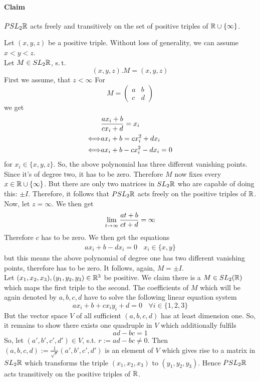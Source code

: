 \documentclass{book}
\begin{document}
\paragraph{Claim} $PSL_2\mathbb{R}$ acts freely and transitively on the set of positive triples of $\mathbb{R} \cup \{\infty\}$.
\begin{Beweis}{}
	Let $(x,y,z)$ be a positive triple. Without loss of generality, we can assume $x<y<z$.\\
	Let $M \in SL_2\mathbb{R}$, s.\,t.
	\[ (x,y,z).M = (x,y,z) \]
	First we assume, that $z < \infty$
	For
	\[ M = \left(
	\begin{matrix}
	a & b \\
	c & d
	\end{matrix}
	\right) \]
	we get
	\begin{align*}
	&\frac{ax_i + b}{cx_i + d} = x_i\\
	\overset{}{\Longleftrightarrow} & ax_i + b = cx_i^2 + dx_i\\
	\overset{}{\Longleftrightarrow} & ax_i + b - cx_i^2 - dx_i = 0
	\end{align*}
	for $x_i \in \{x,y,z\}$. So, the above polynomial has three different vanishing points. Since it's of degree two, it has to be zero. Therefore $M$ now fixes every $x \in \mathbb{R} \cup \{\infty\}$. But there are only two matrices in $SL_2\mathbb{R}$ who are capable of doing this: $\pm I$. Therefore, it follows that $PSL_2\mathbb{R}$ acts freely on the positive triples of $\mathbb{R}$.\\
	Now, let $z = \infty$. We then get
	\[ \lim\limits_{t\overset{}{\rightarrow} \infty} \frac{at + b}{ct +d } = \infty \]
	Therefore $c$ has to be zero. We then get the equations
	\begin{align*}
	ax_i + b - dx_i = 0 ~~~~x_i \in \{x,y\}
	\end{align*}
	but this means the above polynomial of degree one has two different vanishing points, therefore has to be zero. It follows, again, $M = \pm I$.\\
	Let $(x_1, x_2, x_3), (y_1, y_2, y_3) \in \mathbb{R}^3$ be positive. We claim there is a $M \in SL_2(\mathbb{R})$ which maps the first triple to the second. The coefficients of $M$ which will be again denoted by $a,b,c,d$ have to solve the following linear equation system
	\[ ax_i + b +cx_iy_i + d = 0 ~~~~ \forall i \in \{1,2,3\} \]
	But the vector space $V$ of all sufficient $(a,b,c,d)$ has at least dimension one. So, it remains to show there exists one quadruple in $V$ which additionally fulfils
	\[ ad - bc = 1 \]
	So, let $(a',b',c',d') \in V$, s.t. $r :=ad - bc \neq 0$. Then $(a,b,c,d) := \frac{1}{\sqrt{r}}(a',b',c',d')$ is an element of $V$ which gives rise to a matrix in $SL_2\mathbb{R}$ which transforms the triple $(x_1, x_2, x_3)$ to $(y_1,y_2, y_3)$. Hence $PSL_2\mathbb{R}$ acts transitively on the positive triples of $\mathbb{R}$.\\

\end{Beweis}
\end{document}
